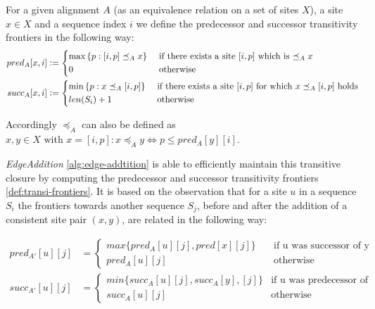 \begin{mydef}
	For a given alignment $A$ (as an equivalence relation on a set of sites $X$), a site $x \in X$ and a sequence index $i$ we define the predecessor and successor transitivity frontiers in the following way:
	\begin{align*}
	pred_A[x, i] &\defeq \begin{cases*} 
		\max{\{p: [i, p] \preceq_A x\}} & \text{ if there exists a site $[i, p]$ which is $\preceq_A x$}\\
		0 & \text { otherwise}
	\end{cases*}\\
	succ_A[x, i] &\defeq  \begin{cases*}
		\min{\{p: x \preceq_A [i, p]\}} & \text{ if there exists a site $[i, p]$ for which $x \preceq_A [i,p]$ holds}\\
		len(S_i) + 1 & \text{ otherwise}
	\end{cases*}
	\end{align*}
	\label{def:transi-frontiers}
\end{mydef}

Accordingly $\preceq_A$ can also be defined as $x,y \in X \text{ with } x = [i, p]: x \preceq_A y \iff p \leq pred_A[y][i]$.

 \textit{EdgeAddition} \ref{alg:edge-addtition} is able to efficiently maintain this transitive closure by computing the predecessor and successor transitivity frontiers \ref{def:transi-frontiers}. It is based on the observation that for a site $u$ in a sequence $S_i$ the frontiers towards another sequence $S_j$, before and after the addition of a consistent site pair $(x, y)$, are related in the following way: 

\begin{align}
	pred_{A'}[u][j] &= \begin{cases}
		max\{pred_A[u][j], pred[x][j]\} \quad \! &\text{if u was successor of y}\\
		pred_A[u][j] &\text{otherwise}
	\end{cases}\\
	succ_{A'}[u][j] &= \begin{cases}
	min\{succ_A[u][j], succ_A[y], [j]\} &\text{if u was predecessor of x}\\
	succ_A[u][j] &\text{otherwise}
	\end{cases}
	\label{obs:frontier-relation}
\end{align}

